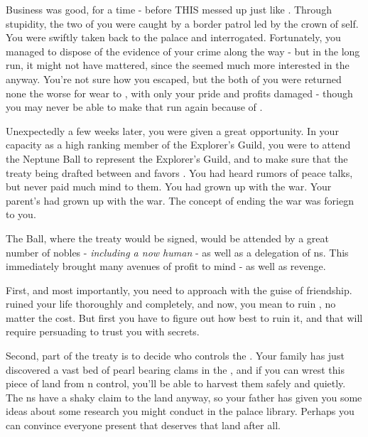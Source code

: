 \documentclass[char]{NeptuneBall}
\begin{document}
Business was good, for a time - before THIS \cPrincess{\prince} messed up just like \cPrincess{\their} \cAriel{\sibling}. Through \cPrincess{\their} stupidity, the two of you were caught by a border patrol led by the crown \cPrince{\Prince} of \pPacifica{} \cPrince{\them}self. You were swiftly taken back to the palace and interrogated. Fortunately, you managed to dispose of the evidence of your crime along the way - but in the long run, it might not have mattered, since the \cPrince{\prince} seemed much more interested in the \cPrincess{\prince} anyway. You're not sure how you escaped, but the both of you were returned none the worse for wear to \pAtlantis{}, with only your pride and profits damaged - though you may never be able to make that run again because of \emph{\cPrincess{\them}}.
 
Unexpectedly a few weeks later, you were given a great opportunity. In your capacity as a high ranking member of the Explorer's Guild, you were to attend the Neptune Ball to represent the Explorer's Guild, and to make sure that the treaty being drafted between \pPacifica{} and \pAtlantis{} favors \pAtlantis{}. You had heard rumors of peace talks, but never paid much mind to them. You had grown up with the war. Your parent's had grown up with the war. The concept of ending the war was foriegn to you. 

The \cExExKing{} Ball, where the treaty would be signed, would be attended by a great number of nobles - \emph{including a now human \cAriel{}} - as well as a delegation of \pPacifica{}ns. This immediately brought many avenues of profit to mind - as well as revenge.

First, and most importantly, you need to approach \cAriel{} with the guise of friendship. \cAriel{\They} ruined your life thoroughly and completely, and now, you mean to ruin \cAriel{\their}, no matter the cost. But first you have to figure out how best to ruin it, and that will require persuading \cAriel{} to trust you with \cAriel{\their} secrets.

Second, part of the treaty is to decide who controls the \pGazaStrip{}. Your family has just discovered a vast bed of pearl bearing clams in the \ptrench{}, and if you can wrest this piece of land from \pPacifica{}n control, you'll be able to harvest them safely and quietly. The \pPacifica{}ns have a shaky claim to the land anyway, so your father has given you some ideas about some research you might conduct in the palace library. Perhaps you can convince everyone present that \pAtlantis{} deserves that land after all.
\end{document}
